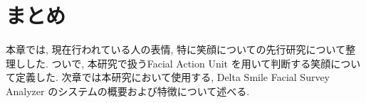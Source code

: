 \section{まとめ}
本章では, 現在行われている人の表情, 特に笑顔についての先行研究について整理しした.
ついで, 本研究で扱うFacial Action Unit を用いて判断する笑顔について定義した.
次章では本研究において使用する, Delta Smile Facial Survey Analyzer のシステムの概要および特徴について述べる.
